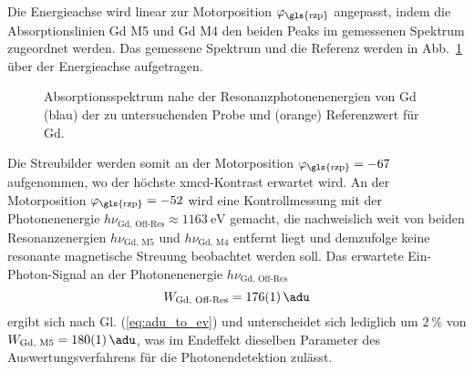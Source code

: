 \noindent
Die Energieachse wird linear zur Motorposition $\varphi_\text{\gls{rzp}}$ angepasst, indem die Absorptionslinien Gd M5 und Gd M4 den beiden Peaks im gemessenen Spektrum zugeordnet werden. Das gemessene Spektrum und die Referenz werden in Abb.~\ref{fig:rzp_phi_ev} über der Energieachse aufgetragen.
\begin{figure}[H]
    \centering
    
    \caption{Absorptionsspektrum nahe der Resonanzphotonenenergien von Gd (blau) der zu untersuchenden Probe und (orange) Referenzwert für Gd.}
    \label{fig:rzp_phi_ev}
\end{figure}
\noindent
Die Streubilder werden somit an der Motorposition $\varphi_\text{\gls{rzp}} = \num{-67}$ aufgenommen, wo der höchste \gls{xmcd}-Kontrast erwartet wird. An der Motorposition $\varphi_\text{\gls{rzp}} = \num{-52}$ wird eine Kontrollmessung mit der Photonenenergie $h\nu_\text{Gd, Off-Res} \approx \SI{1163}{\eV}$ gemacht, die nachweislich weit von beiden Resonanzenergien $h\nu_\text{Gd, M5}$ und $h\nu_\text{Gd, M4}$ entfernt liegt und demzufolge keine resonante magnetische Streuung beobachtet werden soll. Das erwartete Ein-Photon-Signal an der Photonenenergie $h\nu_\text{Gd, Off-Res}$ 
\begin{equation}
    W_\text{Gd, Off-Res} = \SI{176(1)}{\adu}
\end{equation}
ergibt sich nach Gl. (\ref{eq:adu_to_ev}) und unterscheidet sich lediglich um $\SI{2}{\percent}$ von $W_\text{Gd, M5} = \SI{180(1)}{\adu}$, was im Endeffekt dieselben Parameter des Auswertungsverfahrens für die Photonendetektion zulässt.

